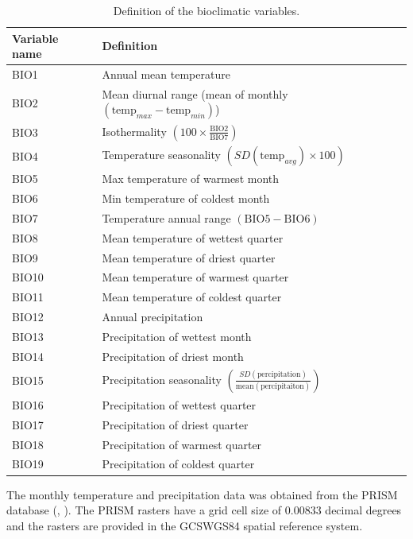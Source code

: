 \begin{table}[htb]
\centering
\begin{tabular}{ll}
\toprule
Variable name & Definition \\ 
\midrule
BIO1 & Annual mean temperature \\
BIO2 & Mean diurnal range (mean of monthly $\left( \text{temp}_{max} - \text{temp}_{min} \right)$) \\
BIO3 & Isothermality $\left( 100 \times \frac{\text{BIO2}}{\text{BIO7}} \right)$  \\
BIO4 & Temperature seasonality $\left(SD(\text{temp}_{avg}) \times 100\right)$ \\
BIO5 & Max temperature of warmest month \\
BIO6 & Min temperature of coldest month \\
BIO7 & Temperature annual range $\left(\text{BIO5} - \text{BIO6}\right)$ \\
BIO8 & Mean temperature of wettest quarter \\
BIO9 & Mean temperature of driest quarter \\
BIO10 & Mean temperature of warmest quarter \\
BIO11 & Mean temperature of coldest quarter \\
BIO12 & Annual precipitation \\
BIO13 & Precipitation of wettest month \\
BIO14 & Precipitation of driest month \\
BIO15 & Precipitation seasonality $\left( \frac{SD( \text{percipitation})}{\text{mean}(\text{percipitaiton})} \right)$ \\
BIO16 & Precipitation of wettest quarter \\
BIO17 & Precipitation of driest quarter \\
BIO18 & Precipitation of warmest quarter \\
BIO19 & Precipitation of coldest quarter \\
\bottomrule
\end{tabular}
\caption{\label{table:Bioclim}Definition of the bioclimatic variables.}
\end{table}

The monthly temperature and precipitation data was obtained from the PRISM database (\cite{daly_knowledge-based_2002}, \citeauthor{PRISM}). The PRISM rasters have a grid cell size of $0.00833$ decimal degrees and the rasters are provided in the GCS\textunderscore WGS84 spatial reference system. \\ 

